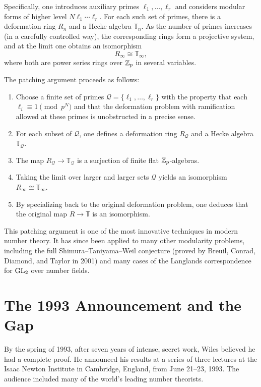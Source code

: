 Specifically, one introduces auxiliary primes \(\ell_1, \dots, \ell_r\) and considers modular forms of higher level \(N \ell_1 \cdots \ell_r\). For each such set of primes, there is a deformation ring \(R_n\) and a Hecke algebra \(\mathbb{T}_n\). As the number of primes increases (in a carefully controlled way), the corresponding rings form a projective system, and at the limit one obtains an isomorphism
\[
R_\infty \cong \mathbb{T}_\infty,
\]
where both are power series rings over \(\mathbb{Z}_p\) in several variables.

The patching argument proceeds as follows:

\begin{enumerate}
    \item Choose a finite set of primes \(\mathcal{Q} = \{\ell_1, \dots, \ell_r\}\) with the property that each \(\ell_i \equiv 1 \pmod{p^N}\) and that the deformation problem with ramification allowed at these primes is unobstructed in a precise sense.
    \item For each subset of \(\mathcal{Q}\), one defines a deformation ring \(R_{\mathcal{Q}}\) and a Hecke algebra \(\mathbb{T}_{\mathcal{Q}}\).
    \item The map \(R_{\mathcal{Q}} \to \mathbb{T}_{\mathcal{Q}}\) is a surjection of finite flat \(\mathbb{Z}_p\)-algebras.
    \item Taking the limit over larger and larger sets \(\mathcal{Q}\) yields an isomorphism \(R_\infty \cong \mathbb{T}_\infty\).
    \item By specializing back to the original deformation problem, one deduces that the original map \(R \to \mathbb{T}\) is an isomorphism.
\end{enumerate}

This patching argument is one of the most innovative techniques in modern number theory. It has since been applied to many other modularity problems, including the full Shimura--Taniyama--Weil conjecture (proved by Breuil, Conrad, Diamond, and Taylor in 2001) and many cases of the Langlands correspondence for \(\operatorname{GL}_2\) over number fields.

\section{The 1993 Announcement and the Gap}

By the spring of 1993, after seven years of intense, secret work, Wiles believed he had a complete proof. He announced his results at a series of three lectures at the Isaac Newton Institute in Cambridge, England, from June 21--23, 1993. The audience included many of the world's leading number theorists.

